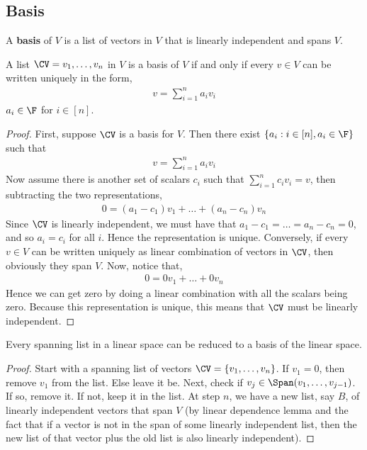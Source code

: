 \documentclass{article}
\begin{document}
\subsection{Basis}
  \begin{defn}
    A \textbf{basis} of $V$ is a list of vectors in $V$ that is linearly independent and spans $V$.
  \end{defn}
  \begin{prop}
    A list $\CV = v_1, \dots, v_n$ in $V$ is a basis of $V$ if and only if every $v \in V$ can be written uniquely in the form,
    \begin{align*}
      v = \sum_{i = 1}^{n}a_iv_i
    \end{align*}
    $a_i \in \F$ for $i \in [n]$.
  \end{prop}
  \begin{proof}
    First, suppose $\CV$ is a basis for $V$. Then there exist $\{a_i: i \in [n], a_i \in \F\}$ such that
    \begin{align*}
      v = \sum_{i = 1}^{n}a_iv_i
    \end{align*}
    Now assume there is another set of scalars $c_i$ such that $\sum_{i = 1}^{n}c_iv_i = v$, then subtracting the two representations,
    \begin{align*}
      0 = (a_1 - c_1)v_1 + \dots + (a_n - c_n)v_n
    \end{align*}
    Since $\CV$ is linearly independent, we must have that $a_1 - c_1 = \dots = a_n - c_n = 0$, and so $a_i = c_i$ for all $i$. Hence the representation is unique. Conversely,
    if every $v \in V$ can be written uniquely as linear combination of vectors in $\CV$, then obviously they span $V$. Now, notice that,
    \begin{align*}
      0 = 0v_1 + \dots + 0v_n
    \end{align*}
    Hence we can get zero by doing a linear combination with all the scalars being zero. Because this representation is unique, this means that $\CV$ must be linearly
    independent.
  \end{proof}
  \begin{prop}\label{prop:reduce.spanning.list.to.basis}
    Every spanning list in a linear space can be reduced to a basis of the linear space.
  \end{prop}
  \begin{proof}
    Start with a spanning list of vectors $\CV = \{v_1, \dots, v_n\}$. If $v_1 = 0$, then remove $v_1$ from the list. Else leave it be. Next, check if $v_j \in \Span(v_1,
    \dots, v_{j - 1})$. If so, remove it. If not, keep it in the list. At step $n$, we have a new list, say $B$, of linearly independent vectors that span $V$ (by linear
    dependence lemma and the fact that if a vector is not in the span of some linearly independent list, then the new list of that vector plus the old list is also linearly
    independent).
  \end{proof}
\end{document}
